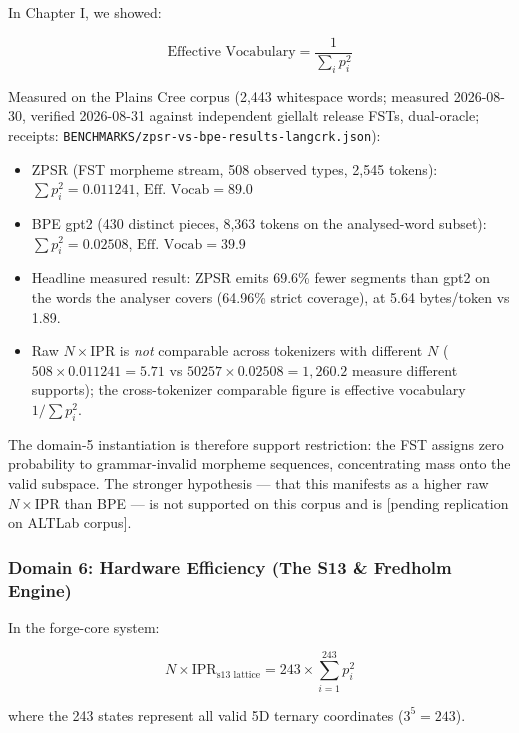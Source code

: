 \documentclass[11pt,oneside]{article}
\theoremstyle{definition}
\begin{document}
In Chapter I, we showed:

\[
\text{Effective Vocabulary} = \frac{1}{\sum_i p_i^2}
\]

Measured on the Plains Cree corpus (2,443 whitespace words; measured 2026-08-30, verified 2026-08-31 against independent giellalt release FSTs, dual-oracle; receipts: \texttt{BENCHMARKS/zpsr-vs-bpe-results-langcrk.json}):
\begin{itemize}
  \item ZPSR (FST morpheme stream, 508 observed types, 2,545 tokens): $\sum p_i^2 = 0.011241$, $\text{Eff. Vocab} = 89.0$
  \item BPE gpt2 (430 distinct pieces, 8,363 tokens on the analysed-word subset): $\sum p_i^2 = 0.02508$, $\text{Eff. Vocab} = 39.9$
  \item Headline measured result: ZPSR emits 69.6\% fewer segments than gpt2 on the words the analyser covers (64.96\% strict coverage), at 5.64 bytes/token vs 1.89.
  \item Raw $N \times \text{IPR}$ is \emph{not} comparable across tokenizers with different $N$ ($508 \times 0.011241 = 5.71$ vs $50257 \times 0.02508 = 1{,}260.2$ measure different supports); the cross-tokenizer comparable figure is effective vocabulary $1/\sum p_i^2$.
\end{itemize}

The domain-5 instantiation is therefore support restriction: the FST assigns zero probability to grammar-invalid morpheme sequences, concentrating mass onto the valid subspace. The stronger hypothesis --- that this manifests as a higher raw $N \times \text{IPR}$ than BPE --- is not supported on this corpus and is [pending replication on ALTLab corpus].

\subsubsection{Domain 6: Hardware Efficiency (The S13 \& Fredholm Engine)}

In the forge-core system:

\[
N \times \text{IPR}_{\text{s13 lattice}} = 243 \times \sum_{i=1}^{243} p_i^2
\]

where the 243 states represent all valid 5D ternary coordinates ($3^5 = 243$).
\end{document}
